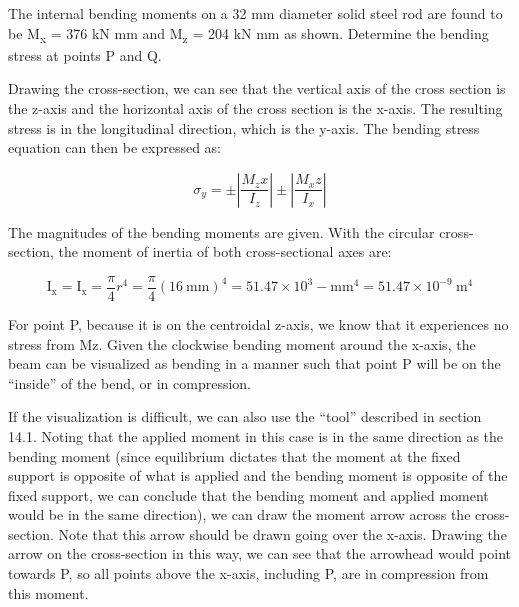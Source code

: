 \documentclass[
  letterpaper,
  DIV=11,
  numbers=noendperiod]{scrreprt}
\begin{document}
\begin{tcolorbox}[enhanced jigsaw, breakable, opacityback=0, toptitle=1mm, left=2mm, colback=white, opacitybacktitle=0.6, colframe=quarto-callout-note-color-frame, titlerule=0mm, arc=.35mm, leftrule=.75mm, bottomtitle=1mm, colbacktitle=quarto-callout-note-color!10!white, rightrule=.15mm, title={Example 14.1:}, bottomrule=.15mm, toprule=.15mm, coltitle=black]

The internal bending moments on a 32 mm diameter solid steel rod are
found to be M\textsubscript{x} = 376 kN mm and M\textsubscript{z} = 204
kN mm as shown. Determine the bending stress at points P and Q.

\begin{tcolorbox}[enhanced jigsaw, breakable, opacityback=0, toptitle=1mm, left=2mm, colback=white, opacitybacktitle=0.6, colframe=quarto-callout-note-color-frame, titlerule=0mm, arc=.35mm, leftrule=.75mm, bottomtitle=1mm, colbacktitle=quarto-callout-note-color!10!white, rightrule=.15mm, title={Solution}, bottomrule=.15mm, toprule=.15mm, coltitle=black]

Drawing the cross-section, we can see that the vertical axis of the
cross section is the z-axis and the horizontal axis of the cross section
is the x-axis. The resulting stress is in the longitudinal direction,
which is the y-axis. The bending stress equation can then be expressed
as:

\[
\sigma_y= \pm\left|\frac{M_z x}{I_z}\right| \pm\left|\frac{M_x z}{I_x}\right|
\]

The magnitudes of the bending moments are given. With the circular
cross-section, the moment of inertia of both cross-sectional axes are:

\[
\mathrm{I}_{\mathrm{x}}=\mathrm{I}_{\mathrm{x}}=\frac{\pi}{4} r^4=\frac{\pi}{4}(16 \mathrm{~mm})^4=51.47 \times 10^3-\mathrm{mm}^4=51.47 \times 10^{-9} \mathrm{~m}^4
\]

For point P, because it is on the centroidal z-axis, we know that it
experiences no stress from Mz. Given the clockwise bending moment around
the x-axis, the beam can be visualized as bending in a manner such that
point P will be on the ``inside'' of the bend, or in compression.

If the visualization is difficult, we can also use the ``tool''
described in section 14.1. Noting that the applied moment in this case
is in the same direction as the bending moment (since equilibrium
dictates that the moment at the fixed support is opposite of what is
applied and the bending moment is opposite of the fixed support, we can
conclude that the bending moment and applied moment would be in the same
direction), we can draw the moment arrow across the cross-section. Note
that this arrow should be drawn going over the x-axis. Drawing the arrow
on the cross-section in this way, we can see that the arrowhead would
point towards P, so all points above the x-axis, including P, are in
compression from this moment.


\end{tcolorbox}
\end{tcolorbox}
\end{document}
